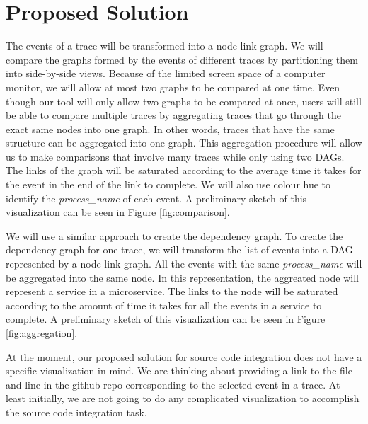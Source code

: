 \section{Proposed Solution}

The events of a trace will be transformed into a node-link graph. We will compare the graphs formed by the events of different traces
by partitioning them into side-by-side views. Because of the limited screen space of a computer monitor, we will allow at most two
graphs to be compared at one time. Even though our tool will only allow two graphs to be compared at once, users will still be able
to compare multiple traces by aggregating traces that go through the exact same nodes into one graph. In other words, traces that have
the same structure can be aggregated into one graph. This aggregation procedure will allow us to make comparisons that involve many
traces while only using two DAGs. The links of the graph will be saturated according to the average time it takes for the event in
the end of the link to complete. We will also use colour hue to identify the \textit{process\_name} of each event. A preliminary sketch of
this visualization can be seen in Figure \ref{fig:comparison}.

We will use a similar approach to create the dependency graph. To create the dependency graph for one trace, we will transform the list
of events into a DAG represented by a node-link graph. All the events with the same \textit{process\_name} will be aggregated into the same
node. In this representation, the aggreated node will represent a service in a microservice. The links to the node will be saturated according
to the amount of time it takes for all the events in a service to complete. A preliminary sketch of this visualization can be seen in Figure \ref{fig:aggregation}.

At the moment, our proposed solution for source code integration does not have a specific visualization in mind. We are thinking about
providing a link to the file and line in the github repo corresponding to the selected event in a trace. At least initially, we are not
going to do any complicated visualization to accomplish the source code integration task.


